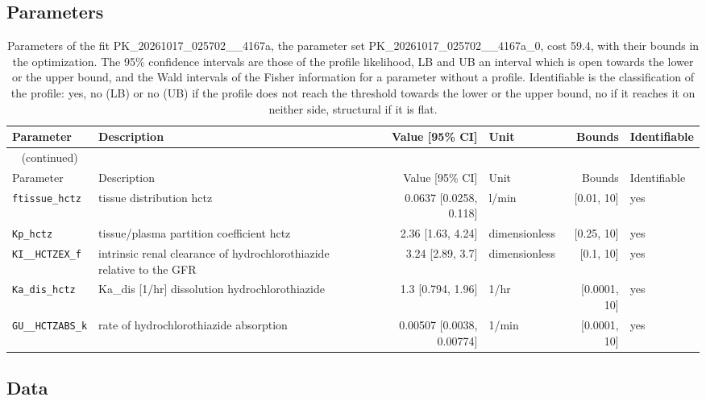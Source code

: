 \subsection{Parameters}

\begin{longtable}{llrlrl}
\caption{Parameters of the fit PK\_20261017\_025702\_\_4167a, the parameter set PK\_20261017\_025702\_\_4167a\_0, cost 59.4, with their bounds in the optimization. The 95\% confidence intervals are those of the profile likelihood, LB and UB an interval which is open towards the lower or the upper bound, and the Wald intervals of the Fisher information for a parameter without a profile. Identifiable is the classification of the profile: yes, no (LB) or no (UB) if the profile does not reach the threshold towards the lower or the upper bound, no if it reaches it on neither side, structural if it is flat.}\label{tab:parameters:PK_20261017_025702__4167a} \\
\toprule
Parameter & Description & Value [95\% CI] & Unit & Bounds & Identifiable \\
\midrule
\endfirsthead
\multicolumn{6}{l}{\small\tablename~\thetable{} (continued)} \\
\toprule
Parameter & Description & Value [95\% CI] & Unit & Bounds & Identifiable \\
\midrule
\endhead
\bottomrule
\endlastfoot
\texttt{ftissue\_hctz} & tissue distribution hctz & 0.0637 [0.0258, 0.118] & l/min & [0.01, 10] & yes \\
\texttt{Kp\_hctz} & tissue/plasma partition coefficient hctz & 2.36 [1.63, 4.24] & dimensionless & [0.25, 10] & yes \\
\texttt{KI\_\_HCTZEX\_f} & intrinsic renal clearance of hydrochlorothiazide relative to the GFR & 3.24 [2.89, 3.7] & dimensionless & [0.1, 10] & yes \\
\texttt{Ka\_dis\_hctz} & Ka\_dis [1/hr] dissolution hydrochlorothiazide & 1.3 [0.794, 1.96] & 1/hr & [0.0001, 10] & yes \\
\texttt{GU\_\_HCTZABS\_k} & rate of hydrochlorothiazide absorption & 0.00507 [0.0038, 0.00774] & 1/min & [0.0001, 10] & yes \\
\end{longtable}

\subsection{Data}

